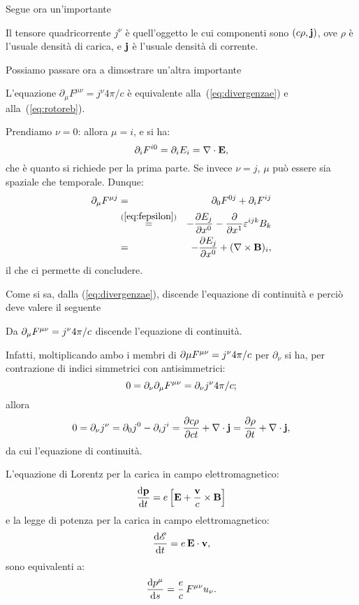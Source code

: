 Segue ora un'importante
\begin{definizione}
  Il tensore quadricorrente $j^{\nu}$ \`e
  quell'oggetto le cui componenti sono $(c\rho, \mathbf{j})$, ove $\rho$
  \`e l'usuale densit\`a di carica, e
  $\mathbf{j}$ \`e l'usuale densit\`a di corrente.
\end{definizione}
Possiamo passare ora a dimostrare un'altra importante
\begin{proposizione}
  L'equazione $ \partial_{\mu} F^{\mu\nu} = j^{\nu}4 \pi /c $ \`e
  equivalente alla~(\ref{eq:divergenzae}) e alla~(\ref{eq:rotoreb}).
\end{proposizione}
\begin{dimostrazione}
  Prendiamo $\nu = 0$: allora $\mu = i$, e si ha:
$$
\partial_i F^{i0} = \partial_i E_i = \mathbf{\nabla \cdot E},
$$
che \`e quanto si richiede per la prima parte. Se invece $\nu = j$,
$\mu$ pu\`o essere sia spaziale che temporale. Dunque:
\begin{eqnarray*}
  \partial_{\mu}F^{\mu j} & = & \partial_0 F^{0j} + \partial_i F^{ij}\\
  & \stackrel{(\ref{eq:fepsilon})}{=} & - \frac{\partial E_j}{\partial x^0}
  - \frac{\partial }{\partial x^1}
  \varepsilon^{ijk}B_k\\
  & = & - \frac{\partial E_j}{\partial x^0}
  + (\mathbf{\nabla \times B})_i,
\end{eqnarray*}
il che ci permette di concludere.
\end{dimostrazione}
Come si sa, dalla (\ref{eq:divergenzae}), discende l'equazione di
continuit\`a e perci\`o deve valere il seguente
\begin{corollario}
  Da $\partial_{\mu} F^{\mu\nu} = j^{\nu}4 \pi /c$ discende l'equazione di
  continuit\`a.
\end{corollario}
\begin{dimostrazione}
  Infatti, moltiplicando ambo i membri di $\partial{\mu} F^{\mu\nu} = j^{\nu}4
  \pi /c$ per $\partial_{\nu}$ si ha, per contrazione di indici
  simmetrici con antisimmetrici:
$$
0 = \partial_{\nu}\partial_{\mu} F^{\mu\nu} = \partial_{\nu} j^{\nu}4 \pi /c;
$$
allora
$$
0 = \partial_{\nu} j^{\nu} = \partial_{0} j^{0} -
\partial_{i} j^{i} = \frac{\partial c \rho}{\partial c t} +
\mathbf{\nabla \cdot j} = \frac{\partial \rho}{\partial t} + \mathbf{\nabla
  \cdot j},
$$
da cui l'equazione di continuit\`a.
\end{dimostrazione}
\begin{proposizione}
  L'equazione di Lorentz per la
  carica in campo
  elettromagnetico:
$$
\frac{\mathrm{d} \mathbf{p}}{\mathrm{d} t} = e \left[ \mathbf{E} + \frac{\mathbf{v}}{c}
  \times \mathbf{B}\right]
$$
e la legge di potenza per la carica in campo elettromagnetico:
$$
\frac{\mathrm{d} \mathscr{E}}{\mathrm{d} t} = e \, \mathbf{E \cdot v},
$$
sono equivalenti a:
$$
\frac{\mathrm{d} p^{\mu}}{\mathrm{d} s}=\frac{e}{c}\, F^{\mu\nu} u_{\nu}.
$$
\end{proposizione}
